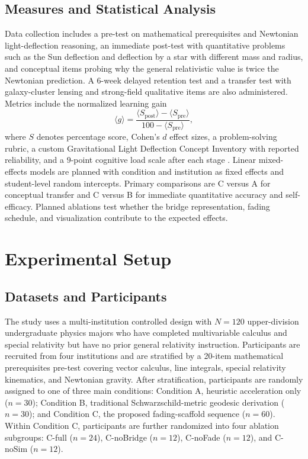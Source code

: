 \documentclass{article}
\begin{document}
\subsection{Measures and Statistical Analysis}
Data collection includes a pre-test on mathematical prerequisites and Newtonian light-deflection reasoning, an immediate post-test with quantitative problems such as the Sun deflection and deflection by a star with different mass and radius, and conceptual items probing why the general relativistic value is twice the Newtonian prediction. A \(6\)-week delayed retention test and a transfer test with galaxy-cluster lensing and strong-field qualitative items are also administered. Metrics include the normalized learning gain
\begin{equation}
\langle g\rangle
=
\frac{\langle S_{\mathrm{post}}\rangle-\langle S_{\mathrm{pre}}\rangle}
{100-\langle S_{\mathrm{pre}}\rangle},
\end{equation}
where \(S\) denotes percentage score, Cohen's \(d\) effect sizes, a problem-solving rubric, a custom Gravitational Light Deflection Concept Inventory with reported reliability, and a \(9\)-point cognitive load scale after each stage \cite{hake1998interactive, sweller2011cognitive, chi2009active}. Linear mixed-effects models are planned with condition and institution as fixed effects and student-level random intercepts. Primary comparisons are C versus A for conceptual transfer and C versus B for immediate quantitative accuracy and self-efficacy. Planned ablations test whether the bridge representation, fading schedule, and visualization contribute to the expected effects.

\section{Experimental Setup}

\subsection{Datasets and Participants}

The study uses a multi-institution controlled design with \(N=120\) upper-division undergraduate physics majors who have completed multivariable calculus and special relativity but have no prior general relativity instruction. Participants are recruited from four institutions and are stratified by a 20-item mathematical prerequisites pre-test covering vector calculus, line integrals, special relativity kinematics, and Newtonian gravity. After stratification, participants are randomly assigned to one of three main conditions: Condition A, heuristic acceleration only (\(n=30\)); Condition B, traditional Schwarzschild-metric geodesic derivation (\(n=30\)); and Condition C, the proposed fading-scaffold sequence (\(n=60\)). Within Condition C, participants are further randomized into four ablation subgroups: C-full (\(n=24\)), C-noBridge (\(n=12\)), C-noFade (\(n=12\)), and C-noSim (\(n=12\)).
\end{document}
